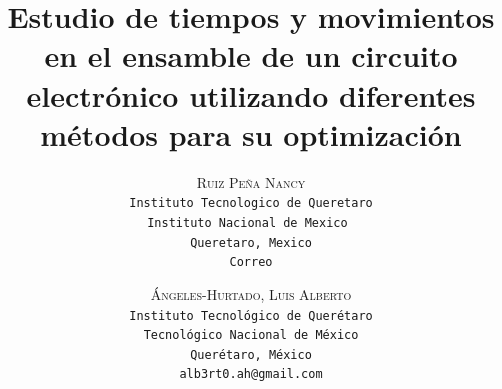     \lfoot{ \thepage}
    
    \setlength{\droptitle}{-5\baselineskip} %
    \title{\textbf{Estudio de tiempos y movimientos en el ensamble de un circuito electrónico utilizando diferentes métodos para su optimización }} %
    
     \author{ 
     \textsc{Ruiz Peña Nancy}\\ 
     \texttt{ Instituto Tecnologico de Queretaro  } \\ 
     \texttt{Instituto Nacional de Mexico } \\ 
     \texttt{Queretaro, Mexico}\\ 
     \texttt{Correo} 
     \and 
     \textsc{Ángeles-Hurtado, Luis Alberto}\\ 
     \texttt{ Instituto Tecnológico de Querétaro } \\ 
     \texttt{ Tecnológico Nacional de México } \\ 
     \texttt{Querétaro, México}\\ 
     \texttt{alb3rt0.ah@gmail.com} 
    }
    
    
    
    
    \maketitle
    \thispagestyle{fancy}
    

